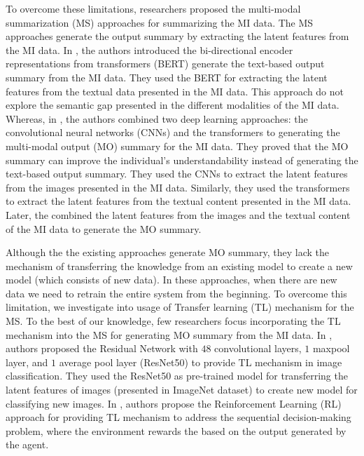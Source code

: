 \documentclass[preprint,review,12pt]{elsarticle}
\begin{document}
To overcome these limitations, researchers proposed the multi-modal summarization (MS) approaches \cite{10,11,12,13,14} for summarizing the MI data. The MS approaches generate the output summary by extracting the latent features from the MI data. In \cite{14}, the authors introduced the bi-directional encoder representations from transformers (BERT) generate the text-based output summary from the MI data. They used the BERT for extracting the latent features from the textual data presented in the MI data. This approach do not explore the semantic gap presented in the different modalities of the MI data. Whereas, in \cite{15,16}, the authors combined two deep learning approaches: the convolutional neural networks (CNNs) and the transformers to generating the multi-modal output (MO) summary for the MI data. They proved that the MO summary can improve the individual's understandability instead of generating the text-based output summary. They used the CNNs to extract the latent features from the images presented in the MI data. Similarly, they used the transformers to extract the latent features from the textual content presented in the MI data. Later, the combined the latent features from the images and the textual content of the MI data to generate the MO summary. 

Although the the existing approaches generate MO summary, they lack the mechanism of transferring the knowledge from an existing model to create a new model (which consists of new data). In these approaches, when there are new data we need to retrain the entire system from the beginning. To overcome this limitation, we investigate into usage of Transfer learning (TL) mechanism for the MS. To the best of our knowledge, few researchers focus incorporating the TL mechanism into the MS for generating MO summary from the MI data. In \cite{17}, authors proposed the Residual Network with $48$ convolutional layers, $1$ maxpool layer, and $1$ average pool layer (ResNet50) to provide TL mechanism in image classification. They used the ResNet50 as pre-trained model for transferring the latent features of images (presented in ImageNet dataset) to create new model for classifying new images. In \cite{18}, authors propose the Reinforcement Learning (RL) approach for providing TL mechanism to address the sequential decision-making problem, where the environment rewards the based on the output generated by the agent.  
\end{document}

